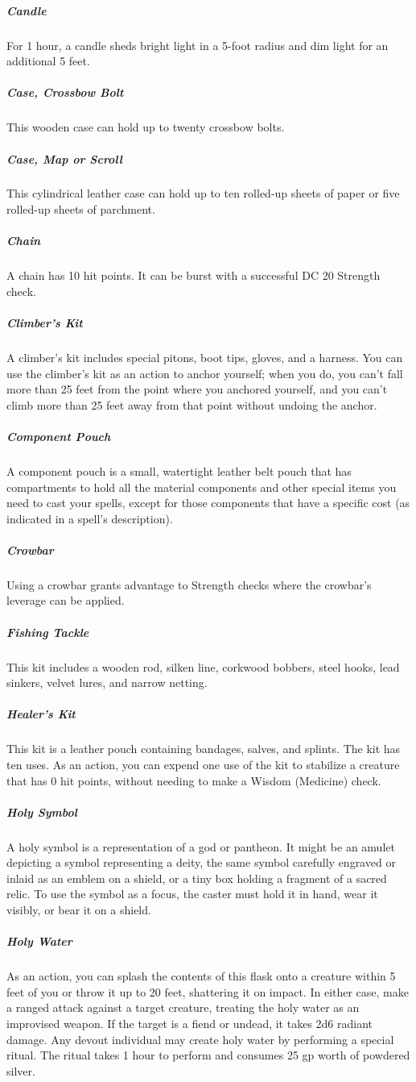 \subparagraph*{Candle} For 1 hour, a candle sheds bright light in a 5-foot radius and dim light for an additional 5 feet.

\subparagraph*{Case, Crossbow Bolt} This wooden case can hold up to twenty crossbow bolts.

\subparagraph*{Case, Map or Scroll} This cylindrical leather case can hold up to ten rolled-up sheets of paper or five rolled-up sheets of parchment.

\subparagraph*{Chain} A chain has 10 hit points. It can be burst with a successful DC 20 Strength check.

\subparagraph*{Climber's Kit} A climber's kit includes special pitons, boot tips, gloves, and a harness. You can use the climber's kit as an action to anchor yourself; when you do, you can't fall more than 25 feet from the point where you anchored yourself, and you can't climb more than 25 feet away from that point without undoing the anchor.

\subparagraph*{Component Pouch} A component pouch is a small, watertight leather belt pouch that has compartments to hold all the material components and other special items you need to cast your spells, except for those components that have a specific cost (as indicated in a spell's description).
\subparagraph*{Crowbar} Using a crowbar grants advantage to Strength checks where the crowbar's leverage can be applied.


\subparagraph*{Fishing Tackle} This kit includes a wooden rod, silken line, corkwood bobbers, steel hooks, lead sinkers, velvet lures, and narrow netting.
\subparagraph*{Healer's Kit} This kit is a leather pouch containing bandages, salves, and splints. The kit has ten uses. As an action, you can expend one use of the kit to stabilize a creature that has 0 hit points, without needing to make a Wisdom (Medicine) check.

\subparagraph*{Holy Symbol} A holy symbol is a representation of a god or pantheon. It might be an amulet depicting a symbol representing a deity, the same symbol carefully engraved or inlaid as an emblem on a shield, or a tiny box holding a fragment of a sacred relic. To use the symbol as a focus, the caster must hold it in hand, wear it visibly, or bear it on a shield.

\subparagraph*{Holy Water} As an action, you can splash the contents of this flask onto a creature within 5 feet of you or throw it up to 20 feet, shattering it on impact. In either case, make a ranged attack against a target creature, treating the holy water as an improvised weapon. If the target is a fiend or undead, it takes 2d6 radiant damage.
Any devout individual may create holy water by performing a special ritual. The ritual takes 1 hour to perform and consumes 25 gp worth of powdered silver.

